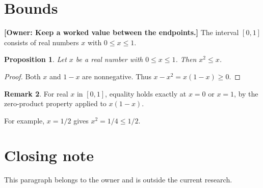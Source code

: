 \documentclass{article}
\newtheorem{proposition}{Proposition}
\theoremstyle{definition}
\newtheorem{remark}[proposition]{Remark}
\newcommand{\taylor}[1]{\textbf{[Owner: #1]}}
\begin{document}
\section{Bounds}
\taylor{Keep a worked value between the endpoints.}
The interval $[0,1]$ consists of real numbers $x$ with $0\leq x\leq1$.
\begin{proposition}\label{prop:bounded-square}
Let $x$ be a real number with $0\leq x\leq1$. Then $x^2\leq x$.
\end{proposition}
\begin{proof}
Both $x$ and $1-x$ are nonnegative. Thus $x-x^2=x(1-x)\geq0$.
\end{proof}
\begin{remark}\label{rem:bounded-square-equality}
For real $x$ in $[0,1]$, equality holds exactly at $x=0$ or $x=1$,
by the zero-product property applied to $x(1-x)$.
\end{remark}
For example, $x=1/2$ gives $x^2=1/4\leq1/2$.

\section{Closing note}
This paragraph belongs to the owner and is outside the current research.
\end{document}
